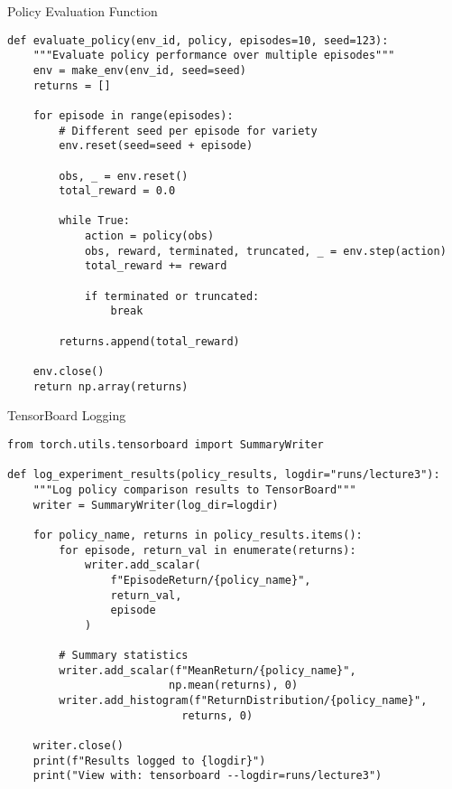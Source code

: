\documentclass[aspectratio=169,10pt]{beamer}
\begin{document}
\begin{frame}[fragile]{Policy Evaluation Function}

\begin{lstlisting}
def evaluate_policy(env_id, policy, episodes=10, seed=123):
    """Evaluate policy performance over multiple episodes"""
    env = make_env(env_id, seed=seed)
    returns = []
    
    for episode in range(episodes):
        # Different seed per episode for variety
        env.reset(seed=seed + episode)
        
        obs, _ = env.reset()
        total_reward = 0.0
        
        while True:
            action = policy(obs)
            obs, reward, terminated, truncated, _ = env.step(action)
            total_reward += reward
            
            if terminated or truncated:
                break
        
        returns.append(total_reward)
    
    env.close()
    return np.array(returns)
\end{lstlisting}

\end{frame}

\begin{frame}[fragile]{TensorBoard Logging}

\begin{lstlisting}
from torch.utils.tensorboard import SummaryWriter

def log_experiment_results(policy_results, logdir="runs/lecture3"):
    """Log policy comparison results to TensorBoard"""
    writer = SummaryWriter(log_dir=logdir)
    
    for policy_name, returns in policy_results.items():
        for episode, return_val in enumerate(returns):
            writer.add_scalar(
                f"EpisodeReturn/{policy_name}", 
                return_val, 
                episode
            )
        
        # Summary statistics
        writer.add_scalar(f"MeanReturn/{policy_name}", 
                         np.mean(returns), 0)
        writer.add_histogram(f"ReturnDistribution/{policy_name}",
                           returns, 0)
    
    writer.close()
    print(f"Results logged to {logdir}")
    print("View with: tensorboard --logdir=runs/lecture3")
\end{lstlisting}

\end{frame}
\end{document}
